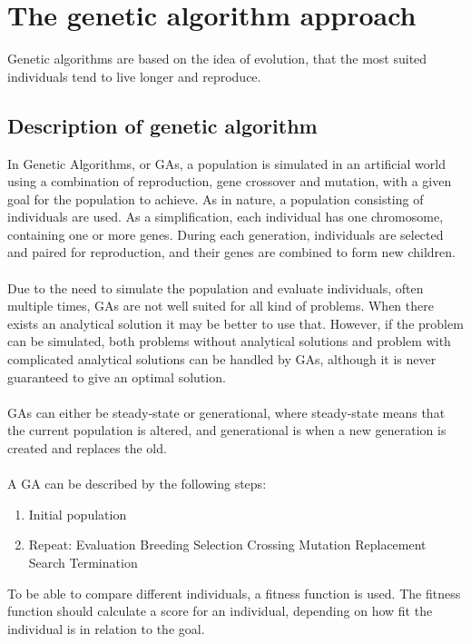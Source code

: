 \pagebreak
\section{The genetic algorithm approach}
Genetic algorithms are based on the idea of evolution, that the most suited individuals tend to live longer and reproduce. 
\subsection{Description of genetic algorithm}
In Genetic Algorithms, or GAs, a population is simulated in an artificial world using a combination of reproduction, gene crossover and mutation, with a given goal for the population to achieve. As in nature, a population consisting of individuals are used. As a simplification, each individual has one chromosome, containing one or more genes. During each generation, individuals are selected and paired for reproduction, and their genes are combined to form new children.\\
\\
Due to the need to simulate the population and evaluate individuals, often multiple times, GAs are not well suited for all kind of problems. When there exists an analytical solution it may be better to use that. However, if the problem can be simulated, both problems without analytical solutions and problem with complicated analytical solutions can be handled by GAs, although it is never guaranteed to give an optimal solution.\\
\\GAs can either be steady-state or generational, where steady-state means that the current population is altered, and generational is when a new generation is created and replaces the old.\\
\\
A GA can be described by the following steps:
\begin{enumerate}
\item Initial population
\item Repeat:
\subitem Evaluation
\subitem Breeding
\subsubitem Selection
\subsubitem Crossing
\subsubitem Mutation
\subsubitem Replacement
\subitem Search Termination
\end{enumerate}
To be able to compare different individuals, a fitness function is used. The fitness function should calculate a score for an individual, depending on how fit the individual is in relation to the goal.\\
